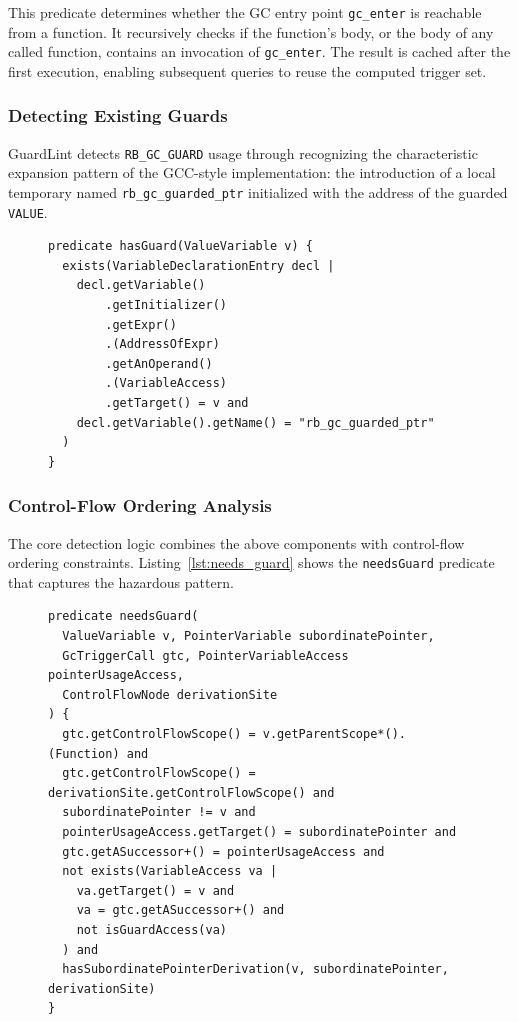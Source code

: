 This predicate determines whether the GC entry point \texttt{gc\_enter} is reachable from a function. It recursively checks if the function's body, or the body of any called function, contains an invocation of \texttt{gc\_enter}. The result is cached after the first execution, enabling subsequent queries to reuse the computed trigger set.

\subsubsection*{Detecting Existing Guards}
GuardLint detects \texttt{RB\_GC\_GUARD} usage through recognizing the characteristic expansion pattern of the GCC-style implementation: the introduction of a local temporary named \texttt{rb\_gc\_guarded\_ptr} initialized with the address of the guarded \texttt{VALUE}.

\begin{figure}[tb]
\begin{lstlisting}[caption={CodeQL predicate for detecting existing guards.},label={lst:guard_detection}]
predicate hasGuard(ValueVariable v) {
  exists(VariableDeclarationEntry decl |
    decl.getVariable()
        .getInitializer()
        .getExpr()
        .(AddressOfExpr)
        .getAnOperand()
        .(VariableAccess)
        .getTarget() = v and
    decl.getVariable().getName() = "rb_gc_guarded_ptr"
  )
}
\end{lstlisting}
\end{figure}

\subsubsection*{Control-Flow Ordering Analysis}
The core detection logic combines the above components with control-flow ordering constraints. Listing~\ref{lst:needs_guard} shows the \texttt{needsGuard} predicate that captures the hazardous pattern.

\begin{figure}[tb]
\begin{lstlisting}[caption={CodeQL predicate for detecting variables that need guards.},label={lst:needs_guard}]
predicate needsGuard(
  ValueVariable v, PointerVariable subordinatePointer,
  GcTriggerCall gtc, PointerVariableAccess pointerUsageAccess,
  ControlFlowNode derivationSite
) {
  gtc.getControlFlowScope() = v.getParentScope*().(Function) and
  gtc.getControlFlowScope() = derivationSite.getControlFlowScope() and
  subordinatePointer != v and
  pointerUsageAccess.getTarget() = subordinatePointer and
  gtc.getASuccessor+() = pointerUsageAccess and
  not exists(VariableAccess va |
    va.getTarget() = v and
    va = gtc.getASuccessor+() and
    not isGuardAccess(va)
  ) and
  hasSubordinatePointerDerivation(v, subordinatePointer, derivationSite)
}
\end{lstlisting}
\end{figure}

